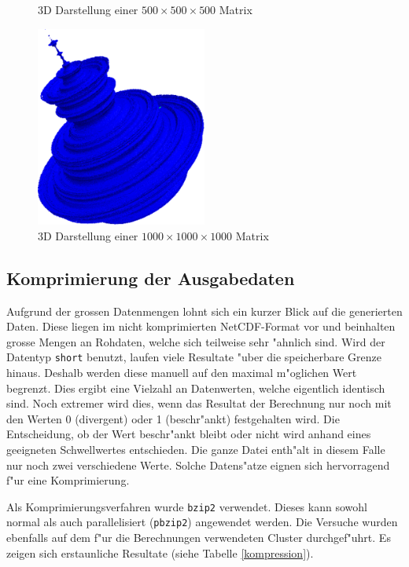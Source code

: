 \begin{refsection}
\begin{figure}[ht!]
	\caption{3D Darstellung einer $500\times500\times 500$ Matrix}
	\label{fig. mandelbrot500}
\end{figure}
\begin{figure}[ht!]\centering
	\includegraphics[width=0.5\textwidth]{apfel/pic/v2_1000.png}
	\caption{3D Darstellung einer $1000\times1000\times 1000$ Matrix}
	\label{fig. mandelbrot1000}
\end{figure}

\subsection{Komprimierung der Ausgabedaten}
Aufgrund der grossen Datenmengen lohnt sich ein kurzer Blick auf die
generierten Daten. Diese liegen im nicht komprimierten NetCDF-Format vor
und beinhalten grosse Mengen an Rohdaten, welche sich teilweise sehr
"ahnlich sind. Wird der Datentyp {\tt short} benutzt, laufen viele
Resultate "uber die speicherbare Grenze hinaus. Deshalb werden diese
manuell auf den maximal m"oglichen Wert begrenzt. Dies ergibt eine
Vielzahl an Datenwerten, welche eigentlich identisch sind. Noch extremer
wird dies, wenn das Resultat der Berechnung nur noch mit den Werten 0
(divergent) oder 1 (beschr"ankt) festgehalten wird. Die Entscheidung,
ob der Wert beschr"ankt bleibt oder nicht wird anhand eines geeigneten
Schwellwertes entschieden. Die ganze Datei enth"alt in diesem Falle nur
noch zwei verschiedene Werte. Solche Datens"atze eignen sich hervorragend
f"ur eine Komprimierung.

Als Komprimierungsverfahren wurde {\tt bzip2} verwendet. Dieses
kann sowohl normal als auch parallelisiert ({\tt pbzip2}) angewendet
werden. Die Versuche wurden ebenfalls auf dem f"ur die Berechnungen
verwendeten Cluster durchgef"uhrt. Es zeigen sich erstaunliche Resultate
(siehe Tabelle \ref{kompression}).


\end{refsection}
